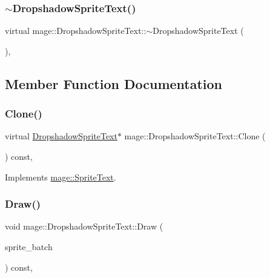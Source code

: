 \subsubsection{\texorpdfstring{$\sim$\+Dropshadow\+Sprite\+Text()}{~DropshadowSpriteText()}}
{\footnotesize\ttfamily virtual mage\+::\+Dropshadow\+Sprite\+Text\+::$\sim$\+Dropshadow\+Sprite\+Text (\begin{DoxyParamCaption}{ }\end{DoxyParamCaption})\hspace{0.3cm}{\ttfamily [virtual]}, {\ttfamily [default]}}



\subsection{Member Function Documentation}
\hypertarget{classmage_1_1_dropshadow_sprite_text_a116c49fb9638414c67a09501c4031a01}{}\label{classmage_1_1_dropshadow_sprite_text_a116c49fb9638414c67a09501c4031a01} 
\subsubsection{\texorpdfstring{Clone()}{Clone()}}
{\footnotesize\ttfamily virtual \hyperlink{classmage_1_1_dropshadow_sprite_text}{Dropshadow\+Sprite\+Text}$\ast$ mage\+::\+Dropshadow\+Sprite\+Text\+::\+Clone (\begin{DoxyParamCaption}{ }\end{DoxyParamCaption}) const\hspace{0.3cm}{\ttfamily [override]}, {\ttfamily [virtual]}}



Implements \hyperlink{classmage_1_1_sprite_text_ac4edf927911a9fb8e5c3a674b217637a}{mage\+::\+Sprite\+Text}.

\hypertarget{classmage_1_1_dropshadow_sprite_text_af76422c9812d7dc38e9b98e587103c67}{}\label{classmage_1_1_dropshadow_sprite_text_af76422c9812d7dc38e9b98e587103c67} 
\subsubsection{\texorpdfstring{Draw()}{Draw()}}
{\footnotesize\ttfamily void mage\+::\+Dropshadow\+Sprite\+Text\+::\+Draw (\begin{DoxyParamCaption}\item[{Sprite\+Batch \&}]{sprite\+\_\+batch }\end{DoxyParamCaption}) const\hspace{0.3cm}{\ttfamily [override]}, {\ttfamily [virtual]}}



